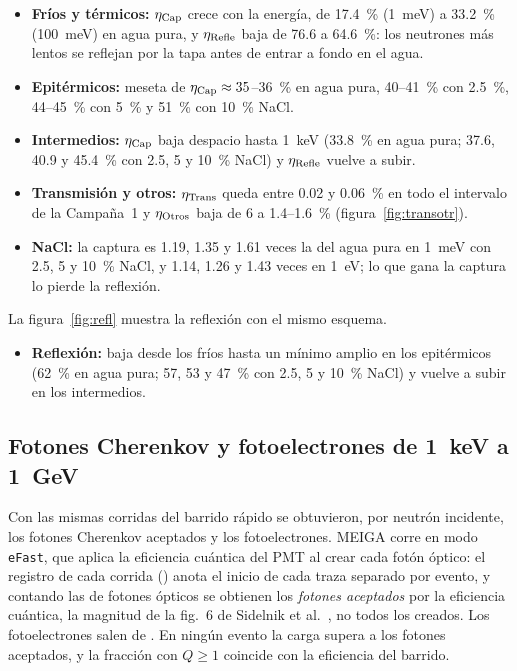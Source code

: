 \documentclass[11pt,a4paper]{article}
\begin{document}
\begin{itemize}
\item \textbf{Fríos y térmicos:} $\eta_{\rm Cap}$ crece con la energía, de 17.4~\% (1~meV) a 33.2~\% (100~meV) en agua
pura, y $\eta_{\rm Refle}$ baja de 76.6 a 64.6~\%: los neutrones más lentos se reflejan por la tapa antes de entrar a
fondo en el agua.
\item \textbf{Epitérmicos:} meseta de $\eta_{\rm Cap}\approx35$--36~\% en agua pura, 40--41~\% con 2.5~\%, 44--45~\%
con 5~\% y 51~\% con 10~\% NaCl.
\item \textbf{Intermedios:} $\eta_{\rm Cap}$ baja despacio hasta 1~keV (33.8~\% en agua pura; 37.6, 40.9 y 45.4~\% con
2.5, 5 y 10~\% NaCl) y
$\eta_{\rm Refle}$ vuelve a subir.
\item \textbf{Transmisión y otros:} $\eta_{\rm Trans}$ queda entre 0.02 y 0.06~\% en todo el intervalo de la
Campaña~1 y $\eta_{\rm Otros}$ baja de 6 a 1.4--1.6~\% (figura~\ref{fig:transotr}).
\item \textbf{NaCl:} la captura es 1.19, 1.35 y 1.61 veces la del agua pura en 1~meV con 2.5, 5 y 10~\% NaCl, y 1.14,
1.26 y 1.43 veces en 1~eV; lo que gana la captura lo pierde la reflexión.
\end{itemize}
La figura~\ref{fig:refl} muestra la reflexión con el mismo esquema.
\begin{itemize}
\item \textbf{Reflexión:} baja desde los fríos hasta un mínimo amplio en los epitérmicos (62~\% en agua pura; 57, 53 y
47~\% con 2.5, 5 y 10~\% NaCl) y vuelve a subir en los intermedios.
\end{itemize}

\subsection{Fotones Cherenkov y fotoelectrones de 1~keV a 1~GeV}\label{sec:luz}
Con las mismas corridas del barrido rápido se obtuvieron, por neutrón incidente, los fotones Cherenkov aceptados y los
fotoelectrones. MEIGA corre en modo \texttt{eFast}, que aplica la eficiencia cuántica del PMT al crear cada fotón óptico:
el registro de cada corrida () anota el inicio de cada traza separado por evento, y contando las de
fotones ópticos se obtienen los \emph{fotones aceptados} por la eficiencia cuántica, la magnitud de la fig.~6 de Sidelnik
et al.~\cite{Sidelnik2020}, no todos los creados. Los fotoelectrones salen de . En ningún evento la
carga supera a los fotones aceptados, y la fracción con $Q\geq1$ coincide con la eficiencia del barrido.
\end{document}

